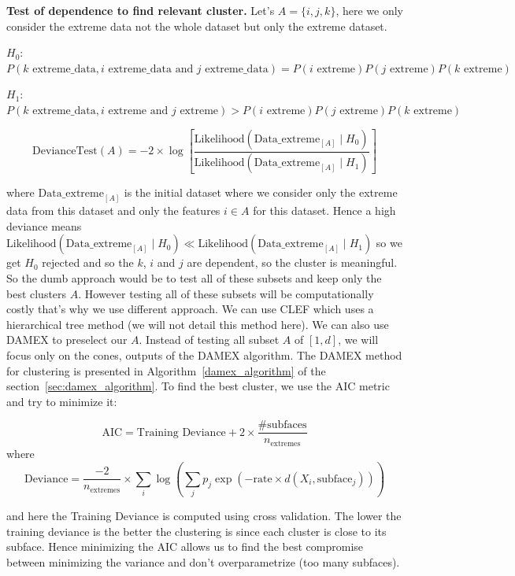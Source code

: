 \documentclass[11pt]{article}
\begin{document}
\textbf{Test of dependence to find relevant cluster.}
Let's $A=\{i, j, k\}$, here we only consider the extreme data not the whole dataset but only the extreme dataset.

$H_0$: $P(k \text{ extreme\_data}, i \text{ extreme\_data and } j \text{ extreme\_data}) = P(i \text{ extreme}) P(j \text{ extreme}) P(k \text{ extreme})$

$H_1$: $P(k \text{ extreme\_data}, i \text{ extreme and } j \text{ extreme}) > P(i \text{ extreme}) P(j \text{ extreme}) P(k \text{ extreme})$

\[
\text{DevianceTest}(A) = -2 \times \log\left[ \frac{\text{Likelihood}(\text{Data\_extreme}_{[A]} \mid H_0)}{\text{Likelihood}(\text{Data\_extreme}_{[A]} \mid H_1)} \right]
\]

where $\text{Data\_extreme}_{[A]}$ is the initial dataset where we consider only the extreme data from this dataset and only the features $i \in A$ for this dataset. Hence a high deviance means $\text{Likelihood}(\text{Data\_extreme}_{[A]} \mid H_0) \ll \text{Likelihood}(\text{Data\_extreme}_{[A]} \mid H_1)$ so we get $H_0$ rejected and so the $k$, $i$ and $j$ are dependent, so the cluster is meaningful.
So the dumb approach would be to test all of these subsets and keep only the best clusters $A$. However testing all of these subsets will be computationally costly that's why we use different approach.
We can use CLEF which uses a hierarchical tree method (we will not detail this method here). We can also use DAMEX to preselect our $A$. Instead of testing all subset $A$ of $[1, d]$, we will focus only on the cones, outputs of the DAMEX algorithm. The DAMEX method for clustering is presented in Algorithm~\ref{damex_algorithm} of the section~\ref{sec:damex_algorithm}. To find the best cluster, we use the AIC metric and try to minimize it:

\[
\text{AIC} = \text{Training Deviance} + 2 \times \frac{\# \text{subfaces}}{n_{\text{extremes}}}
\]
where 
\[
\text{Deviance} = \frac{-2}{n_{\text{extremes}}} \times \sum_i \log\left( \sum_j p_j \exp\left(-\text{rate} \times d(X_i, \text{subface}_j)\right) \right)
\]

and here the Training Deviance is computed using cross validation. The lower the training deviance is the better the clustering is since each cluster is close to its subface. Hence minimizing the AIC allows us to find the best compromise between minimizing the variance and don't overparametrize (too many subfaces).
\end{document}
